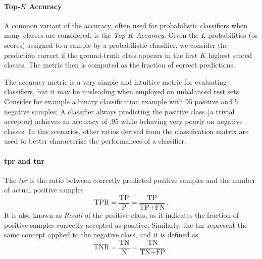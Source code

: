 \paragraph{Top-$K$ Accuracy}
A common variant of the accuracy, often used for probabilistic classifiers when many classes are considered, is the \emph{Top-$K$ Accuracy}.
Given the $L$ probabilities (or scores) assigned to a sample by a probabilistic classifier, we consider the prediction correct if the ground-truth class appears in the first $K$ highest scored classes.
The metric then is computed as the fraction of correct predictions.

The accuracy metric is a very simple and intuitive metric for evaluating classifiers, but it may be misleading when employed on unbalanced test sets.
Consider for example a binary classification example with 95 positive and 5 negative samples;
A classifier always predicting the positive class (a trivial acceptor) achieves an accuracy of $.95$ while behaving very poorly on negative classes.
In this scenarios, other ratios derived from the classification matrix are used to better characterize the performances of a classifier.

\paragraph{\acrshort{tpr} and \acrshort{tnr}}
The \emph{\gls{tpr}} is the ratio between correctly predicted positive samples and the number of actual positive samples
\begin{equation} \label{eq:back:tpr}
    \text{TPR} = \frac{\text{TP}}{\text{P}} = \frac{\text{TP}}{\text{TP} + \text{FN}} \,.
\end{equation}
It is also known as \emph{Recall} of the positive class, as it indicates the fraction of positive samples correctly accepted as positive.
Similarly, the \gls{tnr} represent the same concept applied to the negative class, and it is defined as
\begin{equation} \label{eq:back:tnr}
    \text{TNR} = \frac{\text{TN}}{\text{N}} = \frac{\text{TN}}{\text{TN} + \text{FP}} \,.
\end{equation}

